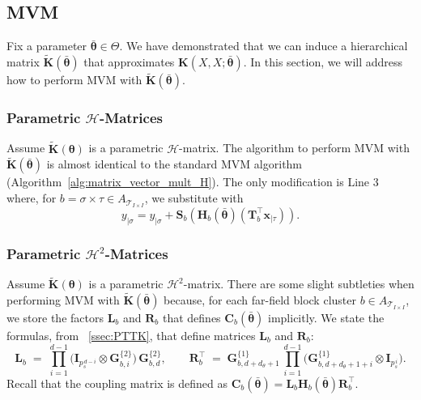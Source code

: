 \documentclass[final,3p,times]{elsarticle}
\newcommand{\mc}[1]{\mathcal{#1}}
\renewcommand{\vec}[1]{\boldsymbol{#1}}
\newcommand{\mat}[1]{\boldsymbol{#1}}
\newcommand{\mathat}[1]{\widetilde{\boldsymbol{#1}}}
\begin{document}
\subsection{MVM} \label{ssec:h_mat_mvm}
Fix a parameter $\bar{\vec{\theta}} \in \Theta$. We have demonstrated that we can induce a hierarchical matrix $\mathat{K}(\bar{\vec{\theta}})$ that approximates  $\mat{K}({X}, {X}; \bar{\vec{\theta}})$. In this section, we will address how to perform MVM with $\mathat{K}(\bar{\vec{\theta}})$.


\subsubsection{Parametric \texorpdfstring{$\mc{H}$}{H}-Matrices}
Assume $\mathat{K}(\vec{\theta})$ is a parametric $\mc{H}$-matrix. The algorithm to perform MVM with $\mathat{K}(\vec{\bar{\vec{\theta}}})$ is almost identical to the standard MVM algorithm (Algorithm~\ref{alg:matrix_vector_mult_H}). The only modification is Line 3 where,  for $b = \sigma \times \tau \in A_{\mc{T}_{I \times I}}$, we substitute with 
$$y_{|\sigma}  = y_{|\sigma} + \mat{S}_{b}(\mat{H}_b(\bar{\vec{\theta}})(\mat{T}_{b}^{\top}\vec{x}_{|\tau})).$$
\subsubsection{Parametric \texorpdfstring{$\mc{H}^{2}$}{H2}-Matrices}
Assume $\mathat{K}(\vec{\theta})$ is a parametric $\mc{H}^{2}$-matrix. There are some slight subtleties when performing MVM with $\mathat{K}(\bar{\vec{\theta}})$  because, for each far-field block cluster $b \in A_{\mc{T}_{I \times I}}$, we store the factors $\mat{L}_{b}$ and $\mat{R}_{b}$ that defines $\mat{C}_{b}(\bar{\vec{\theta}})$ implicitly. We state the formulas, from ~\ref{ssec:PTTK}, that define matrices $\mat{L}_{b}$ and $\mat{R}_{b}$:
\[
\mat{L}_b \;=\;
\prod_{i=1}^{d-1}
\bigl( \mat{I}_{p_s^{\,d-i}} \otimes \mat{G}_{b,i}^{\{2\}} \bigr) \,
\mat{G}_{b,d}^{\{2\}}, 
\qquad
\mat{R}_{b}^{\top} \;=\;
\mat{G}_{b,d+d_\theta+1}^{\{1\}} \,
\prod_{i=1}^{d-1}
\bigl( \mat{G}_{b,d+d_\theta+1+i}^{\{1\}} \otimes \mat{I}_{p_s^{\,i}} \bigr).
\]
Recall that the coupling matrix is defined as $\mat{C}_{b}(\bar{\vec{\theta}}) = \mat{L}_{b}\mat{H}_{b}(\bar{\vec{\theta}})\mat{R}_{b}^{\top}$. 
\end{document}
